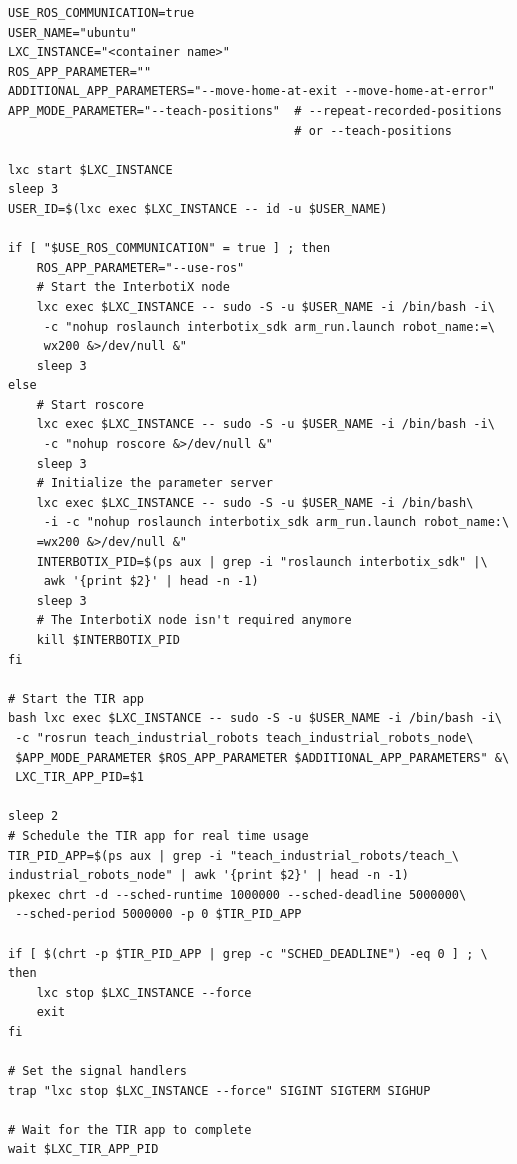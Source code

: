 \begin{lstlisting}[style=bash, caption={Script zum Starten der Roboter-Gesten-Anwendung}, label={lst:start_script_for_app}]
USE_ROS_COMMUNICATION=true
USER_NAME="ubuntu"
LXC_INSTANCE="<container name>"
ROS_APP_PARAMETER=""
ADDITIONAL_APP_PARAMETERS="--move-home-at-exit --move-home-at-error"
APP_MODE_PARAMETER="--teach-positions"  # --repeat-recorded-positions
                                        # or --teach-positions

lxc start $LXC_INSTANCE
sleep 3
USER_ID=$(lxc exec $LXC_INSTANCE -- id -u $USER_NAME)

if [ "$USE_ROS_COMMUNICATION" = true ] ; then
    ROS_APP_PARAMETER="--use-ros"
    # Start the InterbotiX node
    lxc exec $LXC_INSTANCE -- sudo -S -u $USER_NAME -i /bin/bash -i\
     -c "nohup roslaunch interbotix_sdk arm_run.launch robot_name:=\
     wx200 &>/dev/null &"
    sleep 3
else
    # Start roscore
    lxc exec $LXC_INSTANCE -- sudo -S -u $USER_NAME -i /bin/bash -i\
     -c "nohup roscore &>/dev/null &"
    sleep 3
    # Initialize the parameter server
    lxc exec $LXC_INSTANCE -- sudo -S -u $USER_NAME -i /bin/bash\
     -i -c "nohup roslaunch interbotix_sdk arm_run.launch robot_name:\
    =wx200 &>/dev/null &"
    INTERBOTIX_PID=$(ps aux | grep -i "roslaunch interbotix_sdk" |\
     awk '{print $2}' | head -n -1)
    sleep 3
    # The InterbotiX node isn't required anymore
    kill $INTERBOTIX_PID
fi

# Start the TIR app
bash lxc exec $LXC_INSTANCE -- sudo -S -u $USER_NAME -i /bin/bash -i\
 -c "rosrun teach_industrial_robots teach_industrial_robots_node\
 $APP_MODE_PARAMETER $ROS_APP_PARAMETER $ADDITIONAL_APP_PARAMETERS" &\
 LXC_TIR_APP_PID=$1

sleep 2
# Schedule the TIR app for real time usage
TIR_PID_APP=$(ps aux | grep -i "teach_industrial_robots/teach_\
industrial_robots_node" | awk '{print $2}' | head -n -1)
pkexec chrt -d --sched-runtime 1000000 --sched-deadline 5000000\
 --sched-period 5000000 -p 0 $TIR_PID_APP

if [ $(chrt -p $TIR_PID_APP | grep -c "SCHED_DEADLINE") -eq 0 ] ; \
then
    lxc stop $LXC_INSTANCE --force
    exit
fi

# Set the signal handlers
trap "lxc stop $LXC_INSTANCE --force" SIGINT SIGTERM SIGHUP

# Wait for the TIR app to complete
wait $LXC_TIR_APP_PID
\end{lstlisting}



